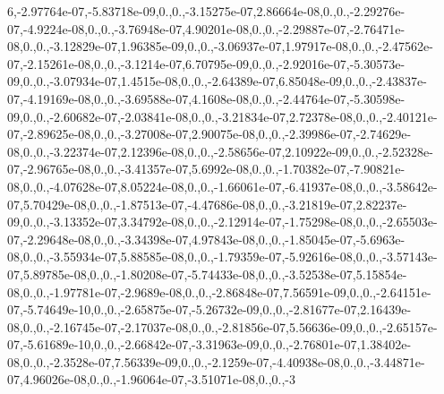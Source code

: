 \begin{DoxyCompactItemize}
6,-\/2.\-97764e-\/07,-\/5.\-83718e-\/09,0.,0.,-\/3.\-15275e-\/07,2.\-86664e-\/08,0.,0.,-\/2.\-29276e-\/07,-\/4.\-9224e-\/08,0.,0.,-\/3.\-76948e-\/07,4.\-90201e-\/08,0.,0.,-\/2.\-29887e-\/07,-\/2.\-76471e-\/08,0.,0.,-\/3.\-12829e-\/07,1.\-96385e-\/09,0.,0.,-\/3.\-06937e-\/07,1.\-97917e-\/08,0.,0.,-\/2.\-47562e-\/07,-\/2.\-15261e-\/08,0.,0.,-\/3.\-1214e-\/07,6.\-70795e-\/09,0.,0.,-\/2.\-92016e-\/07,-\/5.\-30573e-\/09,0.,0.,-\/3.\-07934e-\/07,1.\-4515e-\/08,0.,0.,-\/2.\-64389e-\/07,6.\-85048e-\/09,0.,0.,-\/2.\-43837e-\/07,-\/4.\-19169e-\/08,0.,0.,-\/3.\-69588e-\/07,4.\-1608e-\/08,0.,0.,-\/2.\-44764e-\/07,-\/5.\-30598e-\/09,0.,0.,-\/2.\-60682e-\/07,-\/2.\-03841e-\/08,0.,0.,-\/3.\-21834e-\/07,2.\-72378e-\/08,0.,0.,-\/2.\-40121e-\/07,-\/2.\-89625e-\/08,0.,0.,-\/3.\-27008e-\/07,2.\-90075e-\/08,0.,0.,-\/2.\-39986e-\/07,-\/2.\-74629e-\/08,0.,0.,-\/3.\-22374e-\/07,2.\-12396e-\/08,0.,0.,-\/2.\-58656e-\/07,2.\-10922e-\/09,0.,0.,-\/2.\-52328e-\/07,-\/2.\-96765e-\/08,0.,0.,-\/3.\-41357e-\/07,5.\-6992e-\/08,0.,0.,-\/1.\-70382e-\/07,-\/7.\-90821e-\/08,0.,0.,-\/4.\-07628e-\/07,8.\-05224e-\/08,0.,0.,-\/1.\-66061e-\/07,-\/6.\-41937e-\/08,0.,0.,-\/3.\-58642e-\/07,5.\-70429e-\/08,0.,0.,-\/1.\-87513e-\/07,-\/4.\-47686e-\/08,0.,0.,-\/3.\-21819e-\/07,2.\-82237e-\/09,0.,0.,-\/3.\-13352e-\/07,3.\-34792e-\/08,0.,0.,-\/2.\-12914e-\/07,-\/1.\-75298e-\/08,0.,0.,-\/2.\-65503e-\/07,-\/2.\-29648e-\/08,0.,0.,-\/3.\-34398e-\/07,4.\-97843e-\/08,0.,0.,-\/1.\-85045e-\/07,-\/5.\-6963e-\/08,0.,0.,-\/3.\-55934e-\/07,5.\-88585e-\/08,0.,0.,-\/1.\-79359e-\/07,-\/5.\-92616e-\/08,0.,0.,-\/3.\-57143e-\/07,5.\-89785e-\/08,0.,0.,-\/1.\-80208e-\/07,-\/5.\-74433e-\/08,0.,0.,-\/3.\-52538e-\/07,5.\-15854e-\/08,0.,0.,-\/1.\-97781e-\/07,-\/2.\-9689e-\/08,0.,0.,-\/2.\-86848e-\/07,7.\-56591e-\/09,0.,0.,-\/2.\-64151e-\/07,-\/5.\-74649e-\/10,0.,0.,-\/2.\-65875e-\/07,-\/5.\-26732e-\/09,0.,0.,-\/2.\-81677e-\/07,2.\-16439e-\/08,0.,0.,-\/2.\-16745e-\/07,-\/2.\-17037e-\/08,0.,0.,-\/2.\-81856e-\/07,5.\-56636e-\/09,0.,0.,-\/2.\-65157e-\/07,-\/5.\-61689e-\/10,0.,0.,-\/2.\-66842e-\/07,-\/3.\-31963e-\/09,0.,0.,-\/2.\-76801e-\/07,1.\-38402e-\/08,0.,0.,-\/2.\-3528e-\/07,7.\-56339e-\/09,0.,0.,-\/2.\-1259e-\/07,-\/4.\-40938e-\/08,0.,0.,-\/3.\-44871e-\/07,4.\-96026e-\/08,0.,0.,-\/1.\-96064e-\/07,-\/3.\-51071e-\/08,0.,0.,-\/3
\end{DoxyCompactItemize}
